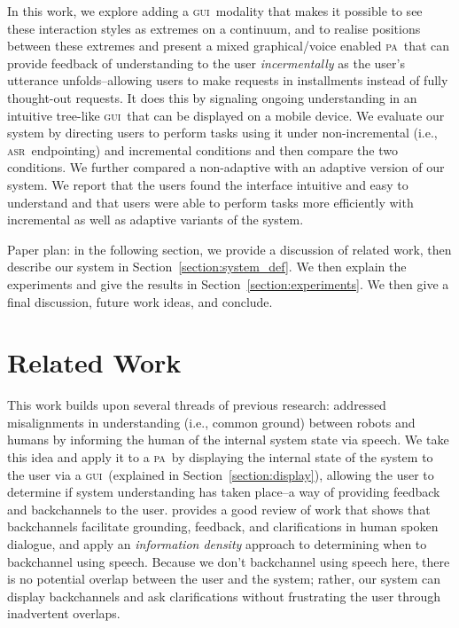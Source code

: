 \documentclass[11pt]{article}
\newcommand{\asr}[0]{\textsc{asr}}
\newcommand{\ui}[0]{\textsc{gui}}
\newcommand{\pa}[0]{\textsc{pa}}
\begin{document}
In this work, we explore adding a \ui\ modality that makes it possible to see these interaction styles as extremes on a continuum, and to realise positions between these extremes and present a mixed graphical/voice enabled \pa\ that can provide feedback of understanding to the user \emph{incermentally} as the user's utterance unfolds--allowing users to make requests in installments instead of fully thought-out requests. It does this by signaling ongoing understanding in an intuitive tree-like \ui\ that can be displayed on a mobile device. We evaluate our system by directing users to perform tasks using it under non-incremental (i.e., \asr\ endpointing) and incremental conditions and then compare the two conditions. We further compared a non-adaptive with an adaptive version of our system. We report that the users found the interface intuitive and easy to understand and that users were able to perform tasks more efficiently with incremental as well as adaptive variants of the system.

Paper plan: in the following section, we provide a discussion of related work, then describe our system in Section~\ref{section:system_def}. We then explain the experiments and give the results in Section~\ref{section:experiments}. We then give a final discussion, future work ideas, and conclude. 

\section{Related Work}
\label{section:related_work}

This work builds upon several threads of previous research:  addressed misalignments in understanding (i.e., common ground) \cite{clarkschaefer:contrdis} between robots and humans by informing the human of the internal system state via speech. We take this idea and apply it to a \pa\ by displaying the internal state of the system to the user via a \ui\ (explained in Section~\ref{section:display}), allowing the user to determine if system understanding has taken place--a way of providing feedback and backchannels to the user.  provides a good review of work that shows that backchannels facilitate grounding, feedback, and clarifications in human spoken dialogue, and apply an \emph{information density} approach to determining when to backchannel using speech. Because we don't backchannel using speech here, there is no potential overlap between the user and the system; rather, our system can display backchannels and ask clarifications without frustrating the user through inadvertent overlaps.
\end{document}
